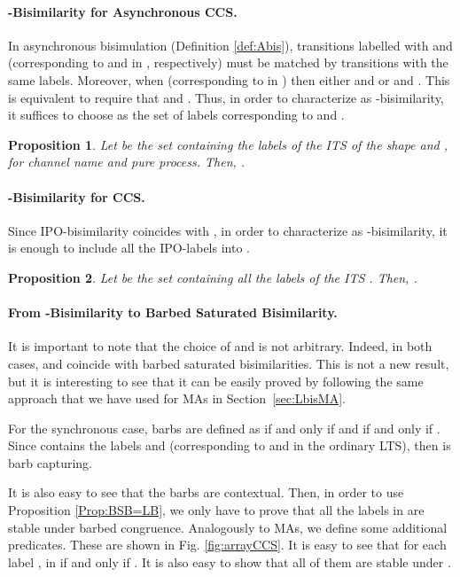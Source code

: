 \documentclass[copyright,creativecommons]{eptcs}
\newcommand{\<}{\langle}
\renewcommand{\>}{\rangle}
\newtheorem{proposition}{Proposition}{}
\begin{document}
\paragraph{-Bisimilarity for Asynchronous CCS.}
In asynchronous bisimulation (Definition \ref{def:Abis}),
transitions labelled with  and  (corresponding to 
and  in , respectively) must be matched by transitions
with the same labels. Moreover, when  (corresponding to
 in ) then either  and  or  and . This is equivalent to require that 
and .
Thus, in order to characterize  as -bisimilarity, it
suffices to choose as  the set of labels corresponding to 
and .



\begin{proposition}
  Let  be the set containing the labels of the ITS  of the
  shape  and , for  channel name and  pure
  process.  Then, .
\end{proposition}

\paragraph{-Bisimilarity for CCS.} Since IPO-bisimilarity coincides
with , in order to characterize  as
-bisimilarity, it is enough to include all the IPO-labels into
.



\begin{proposition}
Let  be the set containing all the labels of the ITS .
Then, .
\end{proposition}

\paragraph{From -Bisimilarity to Barbed Saturated Bisimilarity.}
It is important to note that the choice of  and  is
not arbitrary. Indeed, in both cases,  and
 coincide with barbed saturated bisimilarities. This is
not a new result, but it is interesting to see that it can be easily
proved by following the same approach that we have used for MAs in
Section~\ref{sec:LbisMA}.

For the synchronous case, barbs are defined as  if and
only if
 and  if and only if . Since
 contains the labels  and 
(corresponding to  and  in the ordinary LTS), then
 is barb capturing.

It is also easy to see that the barbs are contextual. Then, in order
to use Proposition \ref{Prop:BSB=LB}, we only have to prove that all
the labels in  are stable under barbed congruence.
Analogously to MAs, we define some additional predicates. These are
shown in Fig. \ref{fig:arrayCCS}. It is easy to see that for each
label ,  in  if and only if . It is also easy to show that all of them are stable
under .
\end{document}
